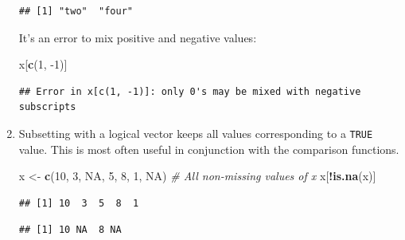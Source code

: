 \documentclass[
]{book}
\newenvironment{Shaded}{\begin{snugshade}}{\end{snugshade}}
\newcommand{\CommentTok}[1]{\textcolor[rgb]{0.56,0.35,0.01}{\textit{#1}}}
\newcommand{\DecValTok}[1]{\textcolor[rgb]{0.00,0.00,0.81}{#1}}
\newcommand{\KeywordTok}[1]{\textcolor[rgb]{0.13,0.29,0.53}{\textbf{#1}}}
\newcommand{\NormalTok}[1]{#1}
\newcommand{\OperatorTok}[1]{\textcolor[rgb]{0.81,0.36,0.00}{\textbf{#1}}}
\newcommand{\OtherTok}[1]{\textcolor[rgb]{0.56,0.35,0.01}{#1}}
\newcommand{\StringTok}[1]{\textcolor[rgb]{0.31,0.60,0.02}{#1}}
\begin{document}
\begin{enumerate}
\begin{verbatim}
## [1] "two"  "four"
\end{verbatim}

  It's an error to mix positive and negative values:

\begin{Shaded}
\begin{Highlighting}[]
\NormalTok{x[}\KeywordTok{c}\NormalTok{(}\DecValTok{1}\NormalTok{, }\DecValTok{-1}\NormalTok{)]}
\end{Highlighting}
\end{Shaded}

\begin{verbatim}
## Error in x[c(1, -1)]: only 0's may be mixed with negative subscripts
\end{verbatim}
\item
  Subsetting with a logical vector keeps all values corresponding to a \texttt{TRUE} value.
  This is most often useful in conjunction with the comparison functions.

\begin{Shaded}
\begin{Highlighting}[]
\NormalTok{x <-}\StringTok{ }\KeywordTok{c}\NormalTok{(}\DecValTok{10}\NormalTok{, }\DecValTok{3}\NormalTok{, }\OtherTok{NA}\NormalTok{, }\DecValTok{5}\NormalTok{, }\DecValTok{8}\NormalTok{, }\DecValTok{1}\NormalTok{, }\OtherTok{NA}\NormalTok{)}
\CommentTok{# All non-missing values of x}
\NormalTok{x[}\OperatorTok{!}\KeywordTok{is.na}\NormalTok{(x)]}
\end{Highlighting}
\end{Shaded}

\begin{verbatim}
## [1] 10  3  5  8  1
\end{verbatim}

\begin{Shaded}
\end{Shaded}

\begin{verbatim}
## [1] 10 NA  8 NA
\end{verbatim}

\begin{Shaded}
\end{Shaded}


\end{enumerate}
\end{document}
